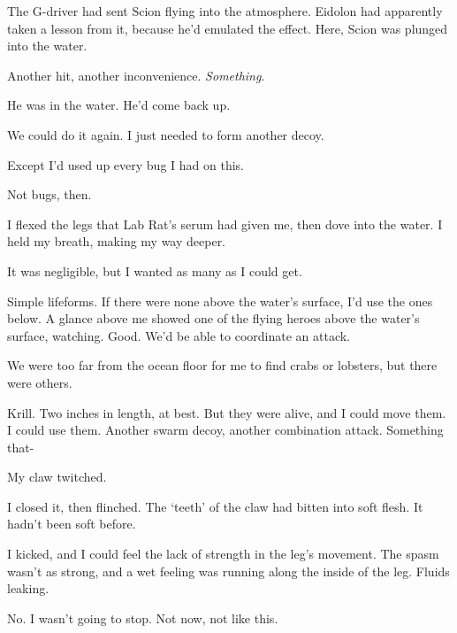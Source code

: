 The G-driver had sent Scion flying into the atmosphere.  Eidolon had apparently taken a lesson from it, because he'd emulated the effect.  Here, Scion was plunged into the water.



Another hit, another inconvenience.  \emph{Something}.



He was in the water.  He'd come back up.



We could do it again.  I just needed to form another decoy.



Except I'd used up every bug I had on this.



Not bugs, then.



I flexed the legs that Lab Rat's serum had given me, then dove into the water.  I held my breath, making my way deeper.



It was negligible, but I wanted as many as I could get.



Simple lifeforms.  If there were none above the water's surface, I'd use the ones below.  A glance above me showed one of the flying heroes above the water's surface, watching.  Good.  We'd be able to coordinate an attack.



We were too far from the ocean floor for me to find crabs or lobsters, but there were others.



Krill.  Two inches in length, at best.  But they were alive, and I could move them.  I could use them.  Another swarm decoy, another combination attack.  Something that-



My claw twitched.



I closed it, then flinched.  The `teeth' of the claw had bitten into soft flesh.  It hadn't been soft before.



I kicked, and I could feel the lack of strength in the leg's movement.  The spasm wasn't as strong, and a wet feeling was running along the inside of the leg.  Fluids leaking.



No.  I wasn't going to stop.  Not now, not like this.



